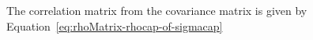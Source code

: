 \noindent The correlation matrix
from the covariance matrix
is given by
Equation~\eqref{eq:rhoMatrix-rhocap-of-sigmacap}
